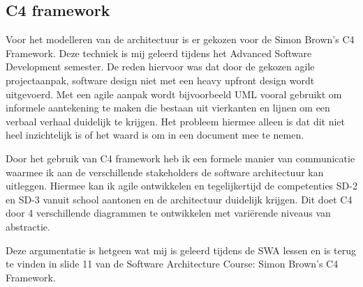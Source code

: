 \subsection{C4 framework}
Voor het modelleren van de architectuur is er gekozen voor de Simon Brown’s C4 Framework. Deze techniek is mij geleerd tijdens het Advanced Software Development semester. De reden hiervoor was dat door de gekozen agile projectaanpak, software design niet met een heavy upfront design wordt uitgevoerd. Met een agile aanpak wordt bijvoorbeeld UML vooral gebruikt om informele aantekening te maken die bestaan uit vierkanten en lijnen om een verbaal verhaal duidelijk te krijgen. Het probleem hiermee alleen is dat dit niet heel inzichtelijk is of het waard is om in een document mee te nemen.\par
Door het gebruik van C4 framework heb ik een formele manier van communicatie waarmee ik aan de verschillende stakeholders de software architectuur kan uitleggen. Hiermee kan ik agile ontwikkelen en tegelijkertijd de competenties SD-2 en SD-3 vanuit school aantonen en de architectuur duidelijk krijgen. Dit doet C4 door 4 verschillende diagrammen te ontwikkelen met variërende niveaus van abstractie.\par
Deze argumentatie is hetgeen wat mij is geleerd tijdens de SWA lessen en is terug te vinden in slide 11 van de Software Architecture Course: Simon Brown’s C4 Framework.